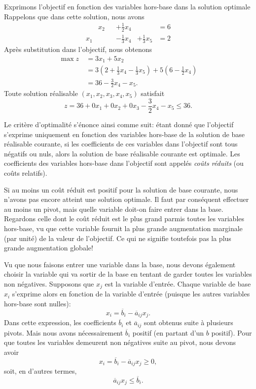 \begin{example}
Exprimons l'objectif en fonction des variables hors-base dans la solution optimale
Rappelons que dans cette solution, nous avons
\[
\begin{matrix}
& x_2 & & +\frac{1}{2}x_4 & & = 6 \\
x_1 & & & -\frac{1}{3}x_4 & +\frac{1}{3}x_5 & = 2
\end{matrix}
\]
Après substitution dans l'objectif, nous obtenons
\begin{align*}
\max z\ & = 3 x_1 + 5 x_2 \\
& = 3 \left(2 + \frac{1}{3} x_4 - \frac{1}{3} x_5 \right) + 5 \left(6 - \frac{1}{2} x_4 \right) \\
& = 36 - \frac{3}{2} x_4 - x_5.
\end{align*}
Toute solution réalisable $(x_1, x_2, x_3, x_4, x_5)$ satisfait
\[
z = 36 + 0 x_1 + 0 x_2 + 0 x_3 - \frac{3}{2} x_4 - x_5 \leq 36.
\]
\end{example}

Le critère d'optimalité s'énonce ainsi comme suit:
étant donné que l'objectif s'exprime uniquement en fonction des variables hors-base de la solution de base réalisable courante, si les coefficients de ces variables dans l'objectif sont tous négatifs ou nuls, alors la solution de base réalisable courante est optimale.
Les coefficients des variables hors-base dans l'objectif sont appelés {\sl coûts réduits} (ou coûts relatifs).

Si au moins un coût réduit est positif pour la solution de base courante, nous n'avons pas encore atteint une solution optimale.
Il faut par conséquent effectuer au moins un pivot, mais quelle variable doit-on faire entrer dans la base.
Regardons celle dont le coût réduit est le plus grand parmis toutes les variables hors-base, vu que cette variable fournit la plus grande augmentation marginale (par unité) de la valeur de l'objectif. Ce qui ne signifie toutefois pas la plus grande augmentation globale!

Vu que nous faisons entrer une variable dans la base, nous devons également choisir la variable qui va sortir de la base en tentant de garder toutes les variables non négatives.
Supposons que $x_j$ est la variable d'entrée. Chaque variable de base $x_i$ s'exprime alors en fonction de la variable d'entrée (puisque les autres variables hors-base sont nulles):
\[
x_i = \overline{b}_i - \overline{a}_{ij}x_j.
\]
Dans cette expression, les coefficients $\overline{b}_i$ et $\overline{a}_{ij}$ sont obtenus suite à plusieurs pivots.
Mais nous avons nécessairement $\overline{b}_i$ positif (en partant d'un $b$ positif).
Pour que toutes les variables demeurent non négatives suite au pivot, nous devons avoir
\[
x_i = \overline{b}_i - \overline{a}_{ij}x_j \geq 0,
\]
soit, en d'autres termes,
\[
\overline{a}_{ij}x_j \leq \overline{b}_i.
\]

